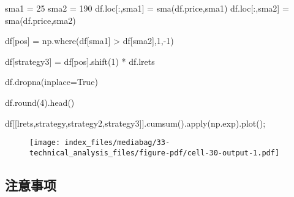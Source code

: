 \documentclass[
  letterpaper,
  DIV=11,
  numbers=noendperiod]{scrreprt}
\newenvironment{Shaded}{\begin{snugshade}}{\end{snugshade}}
\newcommand{\BuiltInTok}[1]{\textcolor[rgb]{0.00,0.23,0.31}{#1}}
\newcommand{\DecValTok}[1]{\textcolor[rgb]{0.68,0.00,0.00}{#1}}
\newcommand{\NormalTok}[1]{\textcolor[rgb]{0.00,0.23,0.31}{#1}}
\newcommand{\OperatorTok}[1]{\textcolor[rgb]{0.37,0.37,0.37}{#1}}
\newcommand{\StringTok}[1]{\textcolor[rgb]{0.13,0.47,0.30}{#1}}
\newcommand{\VariableTok}[1]{\textcolor[rgb]{0.07,0.07,0.07}{#1}}
\begin{document}
\begin{Shaded}
\begin{Highlighting}[]
\NormalTok{sma1 }\OperatorTok{=} \DecValTok{25}
\NormalTok{sma2 }\OperatorTok{=} \DecValTok{190}
\NormalTok{df.loc[:,}\StringTok{\textquotesingle{}sma1\textquotesingle{}}\NormalTok{] }\OperatorTok{=}\NormalTok{ sma(df.price,sma1)}
\NormalTok{df.loc[:,}\StringTok{\textquotesingle{}sma2\textquotesingle{}}\NormalTok{] }\OperatorTok{=}\NormalTok{ sma(df.price,sma2)}

\NormalTok{df[}\StringTok{\textquotesingle{}pos\textquotesingle{}}\NormalTok{] }\OperatorTok{=}\NormalTok{ np.where(df[}\StringTok{\textquotesingle{}sma1\textquotesingle{}}\NormalTok{] }\OperatorTok{\textgreater{}}\NormalTok{ df[}\StringTok{\textquotesingle{}sma2\textquotesingle{}}\NormalTok{],}\DecValTok{1}\NormalTok{,}\OperatorTok{{-}}\DecValTok{1}\NormalTok{)}

\NormalTok{df[}\StringTok{\textquotesingle{}strategy3\textquotesingle{}}\NormalTok{] }\OperatorTok{=}\NormalTok{ df[}\StringTok{\textquotesingle{}pos\textquotesingle{}}\NormalTok{].shift(}\DecValTok{1}\NormalTok{) }\OperatorTok{*}\NormalTok{ df.lrets}

\NormalTok{df.dropna(inplace}\OperatorTok{=}\VariableTok{True}\NormalTok{)}

\NormalTok{df.}\BuiltInTok{round}\NormalTok{(}\DecValTok{4}\NormalTok{).head()}

\NormalTok{df[[}\StringTok{\textquotesingle{}lrets\textquotesingle{}}\NormalTok{,}\StringTok{\textquotesingle{}strategy\textquotesingle{}}\NormalTok{,}\StringTok{\textquotesingle{}strategy2\textquotesingle{}}\NormalTok{,}\StringTok{\textquotesingle{}strategy3\textquotesingle{}}\NormalTok{]].cumsum().}\BuiltInTok{apply}\NormalTok{(np.exp).plot()}\OperatorTok{;}
\end{Highlighting}
\end{Shaded}

\begin{figure}[H]

{\centering \texttt{[image: index\_files/mediabag/33-technical\_analysis\_files/figure-pdf/cell-30-output-1.pdf]}

}

\end{figure}

\hypertarget{ux6ce8ux610fux4e8bux9879}{%
\subsection{注意事项}\label{ux6ce8ux610fux4e8bux9879}}
\end{document}
